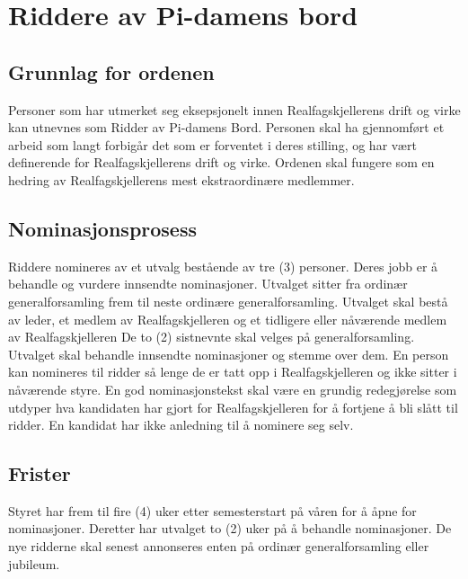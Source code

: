 \section{Riddere av Pi-damens bord} \label{riddere av pi-damens bord}

\subsection{Grunnlag for ordenen} \label{grunnlag for ordenen}

Personer som har utmerket seg eksepsjonelt innen Realfagskjellerens drift og virke kan utnevnes som Ridder av Pi-damens Bord.
Personen skal ha gjennomført et arbeid som langt forbigår det som er forventet i deres stilling, og har vært definerende for Realfagskjellerens drift og virke.
Ordenen skal fungere som en hedring av Realfagskjellerens mest ekstraordinære medlemmer.

\subsection{Nominasjonsprosess} \label{nominasjonsprosess}

Riddere nomineres av  et utvalg bestående av tre (3) personer.
Deres jobb er å behandle og vurdere innsendte nominasjoner.
Utvalget sitter fra ordinær generalforsamling frem til neste ordinære generalforsamling.
Utvalget skal bestå av leder, et medlem av Realfagskjelleren og et tidligere eller nåværende medlem av Realfagskjelleren 
De to (2) sistnevnte skal velges på generalforsamling.
Utvalget skal behandle innsendte nominasjoner og stemme over dem.
En person kan nomineres til ridder så lenge de er tatt opp i Realfagskjelleren og ikke sitter i nåværende styre.
En god nominasjonstekst skal være en grundig redegjørelse som utdyper hva kandidaten har gjort for Realfagskjelleren for å fortjene å bli slått til ridder. 
En kandidat har ikke anledning til å nominere seg selv.

\subsection{Frister} \label{frister}

Styret har frem til fire (4) uker etter semesterstart på våren for å åpne for nominasjoner.
Deretter har utvalget to (2) uker på å behandle nominasjoner.
De nye ridderne skal senest annonseres enten på ordinær generalforsamling eller jubileum.